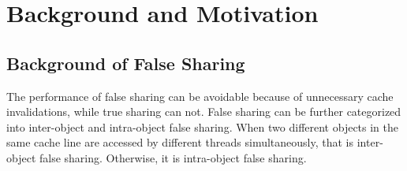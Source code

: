 \section{Background and Motivation}

\label{sec:overview}


\subsection{Background of False Sharing}
\label{sec:background}


The performance of false sharing can be avoidable because of unnecessary cache invalidations, while true sharing can not. False sharing can be further categorized into inter-object and intra-object false sharing. When two different objects in the same cache line are accessed by different threads simultaneously, that is inter-object false sharing. Otherwise, it is intra-object false sharing.  %

